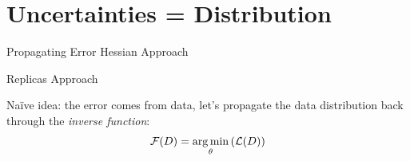 \documentclass[9pt]{beamer}
\begin{document}
\section{Uncertainties = Distribution}

\begin{frame}{Propagating Error}
    Hessian Approach
\end{frame}

\begin{frame}{Replicas}
    \nnpdf{} Approach

    Na\"ive idea: the error comes from data, let's propagate the data
    distribution back through the \textit{inverse function}:
    \begin{equation*}
        \mathcal{F}(D) = \operatorname*{arg\,min}_\theta\left(\mathcal{L}(D)\right)
    \end{equation*}
\end{frame}
\end{document}
